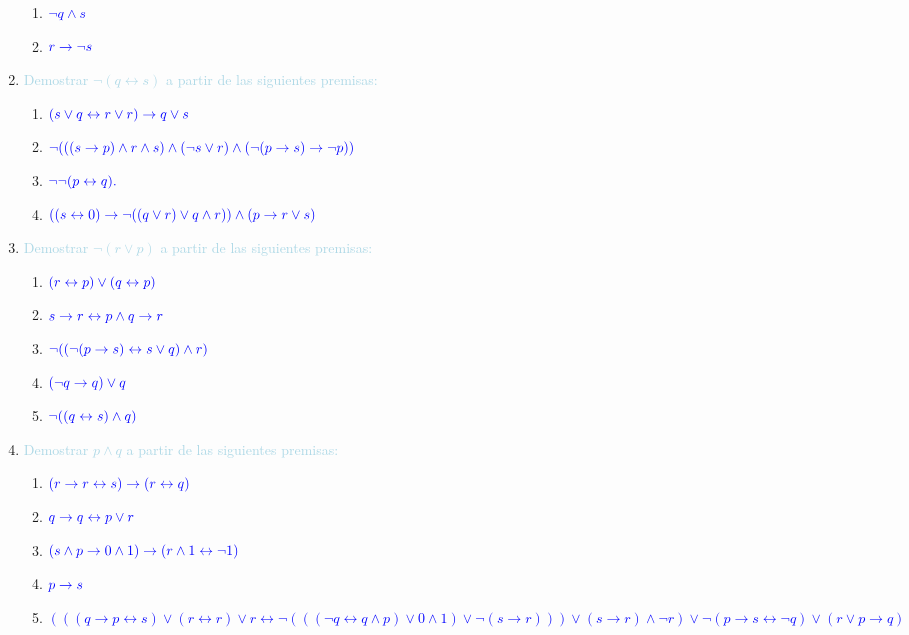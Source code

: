 \documentclass[12pt]{article}
\newcommand{\lb}[1]{\textcolor{lightblue}{#1}}
\newcommand{\db}[1]{\textcolor{blue}{#1}}
\begin{document}
\begin{enumerate}[label=\color{red}\textbf{\arabic*)}, leftmargin=*]
\begin{enumerate}[label=\color{red}\alph*)]
            \item $\db{\neg q\wedge s}$
            \item $\db{r\to\neg s}$
      \end{enumerate}
      \item \lb{Demostrar $\neg(q\leftrightarrow s)$ a partir de las siguientes premisas:}
      \begin{enumerate}[label=\color{red}\alph*)]
            \item $\db{(s\vee q\leftrightarrow r\vee r)\to q\vee s}$
            \item $\db{\neg(((s\to p)\wedge r\wedge s)\wedge(\neg s\vee r)\wedge(\neg(p\to s)\to\neg p))}$
            \item $\db{\neg\neg(p\leftrightarrow q).}$
            \item $\db{((s\leftrightarrow 0)\to\neg((q\vee r)\vee q\wedge r))\wedge(p\to r\vee s)}$
      \end{enumerate}
      \item \lb{Demostrar $\neg(r\vee p)$ a partir de las siguientes premisas:}
      \begin{enumerate}[label=\color{red}\alph*)]
            \item $\db{(r\leftrightarrow p)\vee(q\leftrightarrow p)}$
            \item $\db{s\to r\leftrightarrow p\wedge q\to r}$
            \item $\db{\neg((\neg(p\to s)\leftrightarrow s\vee q)\wedge r)}$
            \item $\db{(\neg q\to q)\vee q}$
            \item $\db{\neg((q\leftrightarrow s)\wedge q)}$
      \end{enumerate}
      \item \lb{Demostrar $p\wedge q$ a partir de las siguientes premisas:}
      \begin{enumerate}[label=\color{red}\alph*)]
            \item $\db{(r\to r\leftrightarrow s)\to(r\leftrightarrow q)}$
            \item $\db{q\to q\leftrightarrow p\vee r}$
            \item $\db{(s\wedge p\to0\wedge 1)\to(r\wedge 1\leftrightarrow\neg1)}$
            \item $\db{p\to s}$
            \item \db{$(((q\to p\leftrightarrow s)\vee(r\leftrightarrow r)\vee r\leftrightarrow\neg(((\neg q\leftrightarrow q\wedge p)\vee0\wedge1)\vee\neg(s\to r)))\vee (s\to r)\wedge\neg r)\vee\neg(p\to s\leftrightarrow\neg q)\vee(r\vee p\to q)$}

\end{enumerate}
\end{enumerate}
\end{document}
